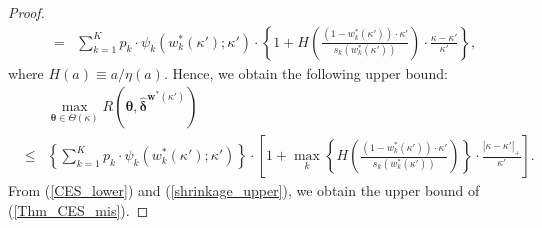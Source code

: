 \documentclass[12pt,a4paper]{article}
\begin{document}
\begin{proof}
\begin{eqnarray}
&=& \sum_{k=1}^K p_k \cdot \psi_k\left( w_k^{\ast}(\kappa') ;\kappa' \right) \cdot \left\{ 1 + H \left( \frac{(1-w_k^{\ast}(\kappa')) \cdot \kappa' }{s_k \left( w_k^{\ast}(\kappa') \right)} \right) \cdot \frac{\kappa - \kappa'}{\kappa'} \right\}, \nonumber
\end{eqnarray}
where $H(a) \equiv a/\eta(a)$. Hence, we obtain the following upper bound:
\begin{eqnarray}
& & \max_{\bm{\theta} \in \Theta(\kappa)} R(\bm{\theta},\hat{\bm{\delta}}^{\bm{w}^*(\kappa')}) \nonumber \\
&\leq & \left\{ \sum_{k=1}^K p_k \cdot \psi_k\left( w_k^{\ast}(\kappa') ;\kappa' \right) \right\} \cdot \left[ 1 + \max_{k} \left\{ H \left( \frac{(1-w_k^{\ast}(\kappa')) \cdot \kappa' }{s_k \left( w_k^{\ast}(\kappa') \right)} \right) \right\} \cdot \frac{|\kappa - \kappa'|_{+}}{\kappa'} \right]. \label{shrinkage_upper}
\end{eqnarray}
From (\ref{CES_lower}) and (\ref{shrinkage_upper}), we obtain the upper bound of (\ref{Thm_CES_mis}).
\end{proof}\vspace{0.1in}
\end{document}
